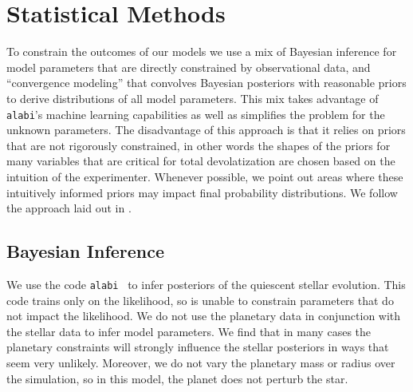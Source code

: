\documentclass[preprint]{aastex631}
\def\alabi{\texttt{\footnotesize{alabi}}\xspace}
\begin{document}



\section{Statistical Methods\label{sec:stats}}

To constrain the outcomes of our models we use a mix of Bayesian inference for model parameters that are directly constrained by observational data, and ``convergence modeling'' that convolves Bayesian posteriors with reasonable priors to derive distributions of all model parameters. This mix takes advantage of \alabi's machine learning capabilities as well as simplifies the problem for the unknown parameters. The disadvantage of this approach is that it relies on priors that are not rigorously constrained, in other words the shapes of the priors for many variables that are critical for total devolatization are chosen based on the intuition of the experimenter. Whenever possible, we point out areas where these intuitively informed priors may impact final probability distributions. We follow the approach laid out in \citep{Gialluca24}.

\subsection{Bayesian Inference\label{sec:alabi}}

We use the code \alabi~\citep{Birky25} to infer posteriors of the quiescent stellar evolution. This code trains only on the likelihood, so is unable to constrain parameters that do not impact the likelihood. We do not use the planetary data in conjunction with the stellar data to infer model parameters. We find that in many cases the planetary constraints will strongly influence the stellar posteriors in ways that seem very unlikely. Moreover, we do not vary the planetary mass or radius over the simulation, so in this model, the planet does not perturb the star.
\end{document}
